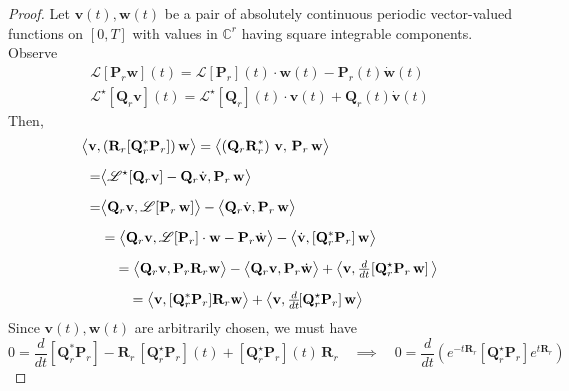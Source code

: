 \documentclass[10pt,a4paper]{amsart}
\begin{document}
\begin{proof}
  Let $\mathbf{v}(t), \mathbf{w}(t)$ be a pair of absolutely continuous periodic vector-valued functions on $[0,T]$ with values in $\mathbb{C}^r$ having square integrable components.  Observe
$$
\begin{array}{c}
\mathscr{L}[\mathbf{P}_r\mathbf{w}](t)=\mathscr{L}[\mathbf{P}_r](t)\cdot \mathbf{w}(t) - \mathbf{P}_r(t)\dot{\mathbf{w}}(t) \\[3mm]
\mathscr{L}^{\star}[\mathbf{Q}_r\mathbf{v}](t)=\mathscr{L}^{\star}[\mathbf{Q}_r](t)\cdot \mathbf{v}(t) + \mathbf{Q}_r(t)\dot{\mathbf{v}}(t)
\end{array}
$$
Then,
\begin{align*}
    \big\langle \mathbf{v},&\,(\mathbf{R}_{r}[\mathbf{Q}_r^{*}\mathbf{P}_r])\, \mathbf{w}\big\rangle  = 
    \big\langle (\mathbf{Q}_r\mathbf{R}_{r}^{*})\ \mathbf{v},\, \mathbf{P}_r\,\mathbf{w}\big\rangle \\[2mm]
    =&\big\langle  \mathscr{L}^{\star}[\mathbf{Q}_r\mathbf{v}]- \mathbf{Q}_r\dot{\mathbf{v}} ,\mathbf{P}_r\,\mathbf{w}\big\rangle \\[2mm]
   = & \big\langle  \mathbf{Q}_r\mathbf{v},\mathscr{L}[\mathbf{P}_r\,\mathbf{w}]\big\rangle - \big\langle \mathbf{Q}_r\dot{\mathbf{v}} ,\mathbf{P}_r\,\mathbf{w}\big\rangle \\[2mm]
   & = \big\langle  \mathbf{Q}_r\mathbf{v},\mathscr{L}[\mathbf{P}_r] \cdot \mathbf{w} - \mathbf{P}_r\dot{\mathbf{w}}\big\rangle - \big\langle \dot{\mathbf{v}} ,[\mathbf{Q}_r^{*}\mathbf{P}_r]\,\mathbf{w}\big\rangle \\[2mm] 
     &\quad = \big\langle  \mathbf{Q}_r\mathbf{v},\mathbf{P}_r\mathbf{R}_{r} \mathbf{w}\big\rangle -  \big\langle  \mathbf{Q}_r\mathbf{v},\mathbf{P}_r\dot{\mathbf{w}}\big\rangle + 
     \big\langle \mathbf{v} ,\mbox{\small $\frac{d}{dt}$}\!\left[\mathbf{Q}_r^{\star}\mathbf{P}_r\,\mathbf{w}\right]\big\rangle \\[2mm]
   &\qquad = \big\langle  \mathbf{v},[\mathbf{Q}_r^{*}\mathbf{P}_r]\mathbf{R}_{r} \mathbf{w}\big\rangle   + \big\langle \mathbf{v} ,\mbox{\small $\frac{d}{dt}$}\![\mathbf{Q}_r^{\star}\mathbf{P}_r]\,\mathbf{w}\big\rangle 
\end{align*}
Since $\mathbf{v}(t), \mathbf{w}(t)$ are arbitrarily chosen, we must have 
\begin{equation*}
0=\frac{d}{dt}\![\mathbf{Q}_r^{*}\mathbf{P}_r]-\mathbf{R}_{r}\,[\mathbf{Q}_r^{\star}\mathbf{P}_r](t)+[\mathbf{Q}_r^{\star}\mathbf{P}_r](t)\,\mathbf{R}_{r}
\quad \implies \quad 
0=\frac{d}{dt}\left(e^{-t\mathbf{R}_{r}}[\mathbf{Q}_r^{\star}\mathbf{P}_r]e^{t\mathbf{R}_{r}}\right)

\end{equation*}
\end{proof}
\end{document}
